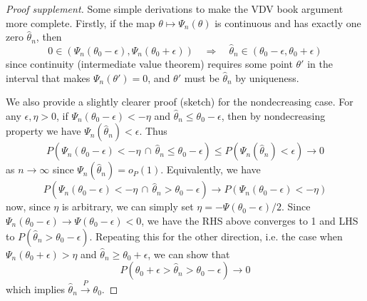 \documentclass{article}
\begin{document}
\begin{proof}[Proof supplement]
    Some simple derivations to make the VDV book argument more complete.
    Firstly, if the map $\theta \mapsto \Psi_n(\theta)$ is continuous and has exactly one zero $\hat{\theta}_n$, then
    \begin{equation}
        0 \in (\Psi_n(\theta_0  - \epsilon), \Psi_n(\theta_0 + \epsilon)) \quad \Longrightarrow \quad \hat{\theta}_n \in (\theta_0  - \epsilon, \theta_0  + \epsilon)
    \end{equation}
    since continuity (intermediate value theorem) requires some point $\theta'$ in the interval that makes $\Psi_n(\theta') = 0$, and $\theta'$ must be $\hat{\theta}_n$ by uniqueness. 

    We also provide a slightly clearer proof (sketch) for the nondecreasing case. For any $\epsilon, \eta > 0$, if $\Psi_n(\theta_0 - \epsilon) < -\eta$ and $\hat{\theta}_n \leq \theta_0 - \epsilon$, then by nondecreasing property we have $\Psi_n(\hat{\theta}_n) < \epsilon$. Thus
    \begin{equation}
        P\left( \Psi_n(\theta_0 - \epsilon) < -\eta \,\cap\, \hat{\theta}_n \leq \theta_0 - \epsilon \right) \leq P\left( \Psi_n(\hat{\theta}_n) < \epsilon \right) \to 0
    \end{equation}
    as $n \to \infty$ since $\Psi_n(\hat{\theta}_n) = o_P(1)$. Equivalently, we have
    \begin{equation}
        P\left( \Psi_n(\theta_0 - \epsilon) < -\eta \,\cap\, \hat{\theta}_n > \theta_0 - \epsilon \right) \to P\left( \Psi_n(\theta_0 - \epsilon) < -\eta \right)
    \end{equation}
    now, since $\eta$ is arbitrary, we can simply set $\eta = -\Psi(\theta_0 - \epsilon) / 2$. Since $\Psi_n(\theta_0 - \epsilon) \to \Psi(\theta_0 - \epsilon) < 0$, we have the RHS above converges to 1 and LHS to $P( \hat{\theta}_n > \theta_0 - \epsilon)$. Repeating this for the other direction, i.e. the case when $\Psi_n(\theta_0 + \epsilon) > \eta$ and $\hat{\theta}_n \geq \theta_0 + \epsilon$, we can show that
    \begin{equation}
        P\left( \theta_0 + \epsilon > \hat{\theta}_n  > \theta_0 - \epsilon \right) \to 0
    \end{equation}
    which implies $\hat{\theta}_n \overset{P}{\rightarrow} \theta_0$.
\end{proof}
\newpage
\end{document}

